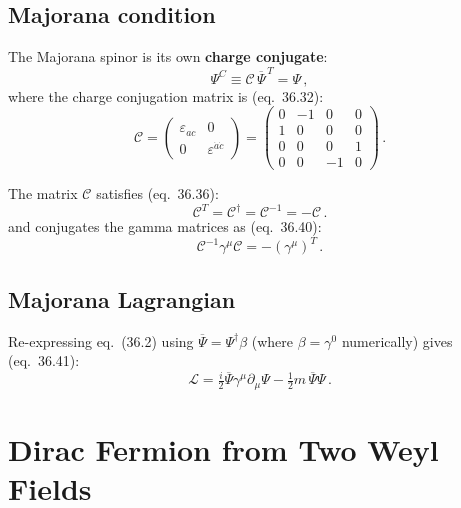 \subsection{Majorana condition}

The Majorana spinor is its own \textbf{charge conjugate}:
\begin{equation}
  \Psi^C \equiv \mathcal{C}\,\overline{\Psi}^{\,T} = \Psi\,,
\end{equation}
where the charge conjugation matrix is (eq.~36.32):
\begin{equation}
  \mathcal{C} = \begin{pmatrix}\varepsilon_{ac}&0\\0&\varepsilon^{\dot{a}\dot{c}}\end{pmatrix}
  = \begin{pmatrix}0 & -1 & 0 & 0 \\ 1 & 0 & 0 & 0 \\ 0 & 0 & 0 & 1 \\ 0 & 0 & -1 & 0\end{pmatrix}\,.
  \tag{36.32}
\end{equation}

The matrix $\mathcal{C}$ satisfies (eq.~36.36):
\begin{equation}
  \mathcal{C}^T = \mathcal{C}^\dagger = \mathcal{C}^{-1} = -\mathcal{C}\,.
  \tag{36.36}
\end{equation}
and conjugates the gamma matrices as (eq.~36.40):
\begin{equation}
  \mathcal{C}^{-1}\gamma^\mu\mathcal{C} = -(\gamma^\mu)^T\,.
  \tag{36.40}
\end{equation}

\subsection{Majorana Lagrangian}

Re-expressing eq.~(36.2) using $\overline{\Psi}=\Psi^\dagger\beta$ (where $\beta=\gamma^0$
numerically) gives (eq.~36.41):
\begin{equation}
  \mathcal{L} = \tfrac{i}{2}\overline{\Psi}\gamma^\mu\partial_\mu\Psi
              - \tfrac{1}{2}m\,\overline{\Psi}\Psi\,.
  \tag{36.41}
\end{equation}

\section{Dirac Fermion from Two Weyl Fields}


